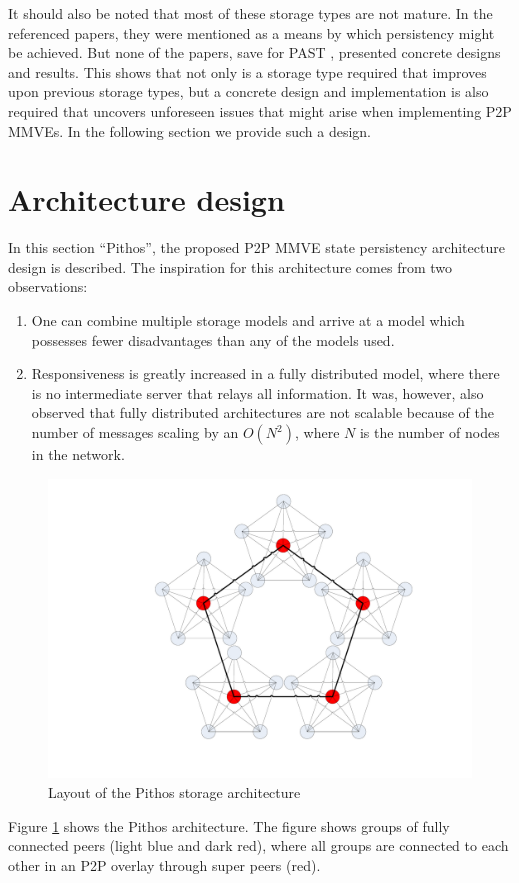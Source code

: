 \documentclass[10pt,a4paper,conference]{IEEEtran}
\begin{document}
It should also be noted that most of these storage types are not mature. In the referenced papers, they were mentioned as a means by which
persistency might be achieved. But none of the papers, save for PAST \cite{storage_and_chaching_PAST}, presented concrete designs and results. This
shows that not only is a storage type required that improves upon previous storage types, but a concrete design and implementation is also required
that uncovers unforeseen issues that might arise when implementing P2P MMVEs. In the following section we provide such a design.

\section{Architecture design}
\label{design}

In this section ``Pithos'', the proposed P2P MMVE state persistency architecture design is described. The inspiration for this architecture comes
from two observations:
%
\begin{enumerate}
  \item One can combine multiple storage models and arrive at a model which possesses fewer disadvantages than any of the models used.
  \item Responsiveness is greatly increased in a fully distributed model, where there is no intermediate server that relays all information. It
      was, however, also observed that fully distributed architectures are not scalable because of the number of messages scaling by an $O(N^2)$,
      where $N$ is the number of nodes in the network.
\end{enumerate}

\begin{figure}[htbp]
 \centering
 \includegraphics[clip=true, viewport=7.5cm 2.5cm 26cm 20cm, width=0.7\columnwidth]{CDHT_layout}
 \caption{Layout of the Pithos storage architecture}
 \label{fig_pithos}
\end{figure}
%
Figure \ref{fig_pithos} shows the Pithos architecture. The figure shows groups of fully connected peers (light blue and dark red), where all groups
are connected to each other in an P2P overlay through super peers (red).
\end{document}
